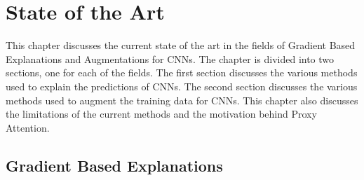\chapter{State of the Art} \label{ch:sota}
This chapter discusses the current state of the art in the fields of Gradient Based Explanations and Augmentations for CNNs. The chapter is divided into two sections, one for each of the fields. The first section discusses the various methods used to explain the predictions of CNNs. The second section discusses the various methods used to augment the training data for CNNs. This chapter also discusses the limitations of the current methods and the motivation behind Proxy Attention.

\section{Gradient Based Explanations} \label{sec:gradient_based_explanations}
